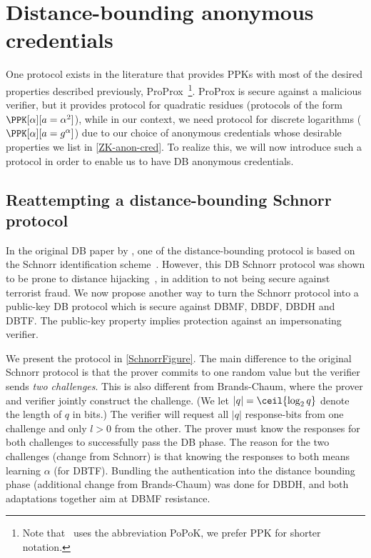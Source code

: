 \section{Distance-bounding anonymous credentials}%
\label{DB-anon-cred}

One protocol exists in the literature that provides \acp{PPK} with most of the 
desired properties described previously, ProProx~\cite{ProProx}\footnote{Note 
  that~\cite{ProProx} uses the abbreviation PoPoK, we prefer \acs{PPK} for 
  shorter notation.}.
ProProx is secure against a malicious verifier, but it provides  
protocol for quadratic residues (\ie protocols of the form \(\PPK[\alpha][a = 
  \alpha^2]\)), while in our context, we need  protocol for discrete 
logarithms (\ie \(\PPK[\alpha][a = g^\alpha]\)) due to our choice of 
anonymous credentials whose desirable properties we list in
\cref{ZK-anon-cred}.%
To realize this, we will now introduce such a protocol in order to enable us to have \ac{DB} anonymous credentials.

\subsection{Reattempting a distance-bounding Schnorr protocol}%
\label{DBSchnorr}

In the original \ac{DB} paper by \citet{DistanceBounding}, one of the distance-bounding protocol is based on the Schnorr identification scheme~\cite{Schnorr}.
However, this \ac{DB} Schnorr protocol was shown to be prone to distance hijacking~\cite{DistanceHijacking, TamarinDB}, in addition to not being secure against terrorist fraud.
We now propose another way to turn the Schnorr protocol into a
public-key \ac{DB} protocol which is secure against \ac{DBMF},
\ac{DBDF}, \ac{DBDH} and \ac{DBTF}.
The public-key property implies protection against an impersonating
verifier.

We present the protocol in \cref{SchnorrFigure}.
The main difference to the original Schnorr protocol is that the prover commits 
to one random value but the verifier sends \emph{two challenges}.
This is also different from Brands-Chaum, where the prover and verifier jointly 
construct the challenge.
(We let \(|q| = \ceil{\log_2 q}\) denote the length of \(q\) in bits.)
The verifier will request all \(|q|\) response-bits from one challenge and only 
\(l > 0\) from the other.
The prover must know the responses for both challenges to successfully pass the 
\ac{DB} phase.
The reason for the two challenges (change from Schnorr) is that
knowing the responses to both means learning $\alpha$ (for
\ac{DBTF}). Bundling the authentication into the distance bounding
phase (additional change from Brands-Chaum) was done for \ac{DBDH},
and both adaptations together aim at \ac{DBMF} resistance. %

